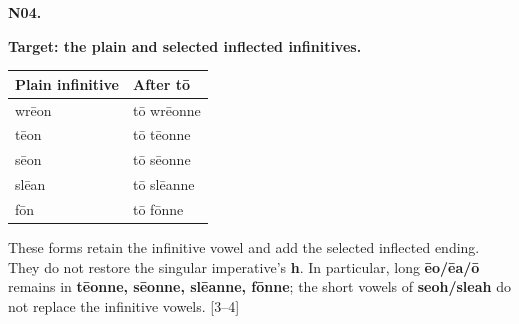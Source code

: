 \par\begin{minipage}{\linewidth}\raggedright
\textbf{N04.}

\textbf{Target: the plain and selected inflected infinitives.}

\par\begingroup
\fontsize{10.5}{13.2}\selectfont
\setlength{\LTleft}{0pt}\setlength{\LTright}{\fill}
\noindent
\begin{tabular}{@{}>{\raggedright\arraybackslash}p{67.8mm}>{\raggedright\arraybackslash}p{53.39mm}@{}}
\toprule
\textbf{Plain infinitive} & \textbf{After tō} \\
\midrule
wrēon & tō wrēonne \\
tēon & tō tēonne \\
sēon & tō sēonne \\
slēan & tō slēanne \\
fōn & tō fōnne \\
\bottomrule
\end{tabular}
\par\endgroup

These forms retain the infinitive vowel and add the selected inflected ending. They do not restore the singular imperative’s \textbf{h}. In particular, long \textbf{ēo/\allowbreak{}ēa/\allowbreak{}ō} remains in \textbf{tēonne, sēonne, slēanne, fōnne}; the short vowels of \textbf{seoh/\allowbreak{}sleah} do not replace the infinitive vowels. [3–4]

\end{minipage}\par\addvspace{4pt}

